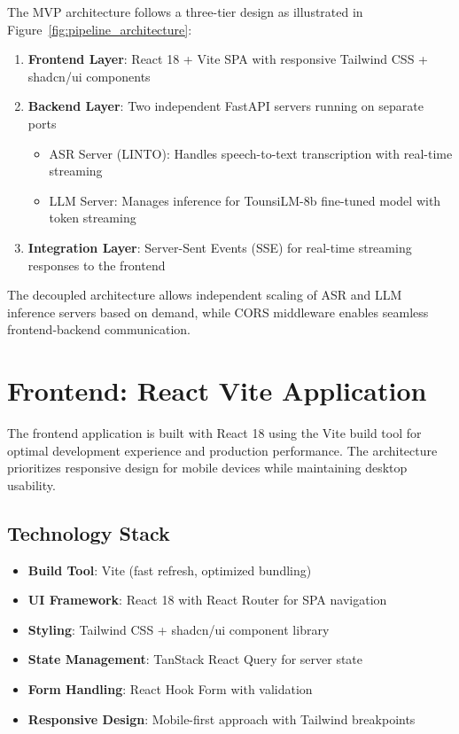 \documentclass[12pt,a4paper]{report}
\begin{document}
The MVP architecture follows a three-tier design as illustrated in Figure~\ref{fig:pipeline_architecture}:

\begin{enumerate}
    \item \textbf{Frontend Layer}: React 18 + Vite SPA with responsive Tailwind CSS + shadcn/ui components
    \item \textbf{Backend Layer}: Two independent FastAPI servers running on separate ports
    \begin{itemize}
        \item ASR Server (LINTO): Handles speech-to-text transcription with real-time streaming
        \item LLM Server: Manages inference for TounsiLM-8b fine-tuned model with token streaming
    \end{itemize}
    \item \textbf{Integration Layer}: Server-Sent Events (SSE) for real-time streaming responses to the frontend
\end{enumerate}

The decoupled architecture allows independent scaling of ASR and LLM inference servers based on demand, while CORS middleware enables seamless frontend-backend communication.

\section{Frontend: React Vite Application}

The frontend application is built with React 18 using the Vite build tool for optimal development experience and production performance. The architecture prioritizes responsive design for mobile devices while maintaining desktop usability.

\subsection{Technology Stack}

\begin{itemize}
    \item \textbf{Build Tool}: Vite (fast refresh, optimized bundling)
    \item \textbf{UI Framework}: React 18 with React Router for SPA navigation
    \item \textbf{Styling}: Tailwind CSS + shadcn/ui component library
    \item \textbf{State Management}: TanStack React Query for server state
    \item \textbf{Form Handling}: React Hook Form with validation
    \item \textbf{Responsive Design}: Mobile-first approach with Tailwind breakpoints
\end{itemize}
\end{document}
